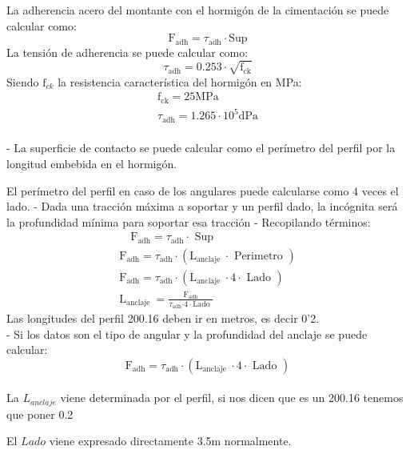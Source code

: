 \documentclass{article}
\begin{document}
            La adherencia acero del montante con el hormigón de la cimentación se puede calcular como:
            $$
            \mathrm{F}_{\mathrm{adh}}=\tau_{\mathrm{adh}} \cdot \mathrm{Sup}
            $$
            La tensión de adherencia se puede calcular como:
            $$
            \tau_{\mathrm{adh}}=0.253 \cdot \sqrt{\mathrm{f}_{\mathrm{ck}}}
            $$
            Siendo $\mathrm{f}_{c k}$ la resistencia característica del hormigón en MPa:
            $$
            \begin{array}{c}
            \mathrm{f}_{\mathrm{ck}}=25 \mathrm{MPa} \\
            \tau_{\mathrm{adh}}=1.265 \cdot 10^5 \mathrm{dPa}
            \end{array}
            $$
            \\
            
            - La superficie de contacto se puede calcular como el perímetro del perfil por la longitud embebida en el hormigón.

El perímetro del perfil en caso de los angulares puede calcularse como 4 veces el lado.
- Dada una tracción máxima a soportar y un perfil dado, la incógnita será la profundidad mínima para soportar esa tracción
- Recopilando términos:
$$
\begin{array}{c}
\quad \mathrm{F}_{\mathrm{adh}}=\tau_{\mathrm{adh}} \cdot \text { Sup } \\
\mathrm{F}_{\mathrm{adh}}=\tau_{\mathrm{adh}} \cdot\left(\mathrm{L}_{\text {anclaje }} \cdot \text { Perimetro }\right) \\
\mathrm{F}_{\mathrm{adh}}=\tau_{\mathrm{adh}} \cdot\left(\mathrm{L}_{\text {anclaje }} \cdot 4 \cdot \text { Lado }\right) \\
\mathrm{L}_{\text {anclaje }}=\frac{\mathrm{F}_{\mathrm{adh}}}{\tau_{\mathrm{adh}}{\cdot 4} \cdot \text {Lado }}
\end{array}
$$
Las longitudes del perfil 200.16 deben ir en metros, es decir 0'2.
\\

- Si los datos son el tipo de angular y la profundidad del anclaje se puede calcular:
$$
\mathrm{F}_{\mathrm{adh}}=\tau_{\mathrm{adh}} \cdot\left(\mathrm{L}_{\text {anclaje }} \cdot 4 \cdot \text { Lado }\right)
$$
\\

La $L_{anclaje}$ viene determinada por el perfil, si nos dicen que es un 200.16 tenemos que poner 0.2

El $Lado$ viene expresado directamente 3.5m normalmente.
\end{document}
